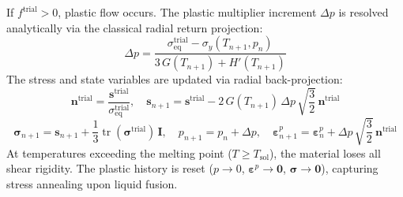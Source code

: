 \documentclass[10pt,a4paper]{article}
\begin{document}
If $f^{\mathrm{trial}} > 0$, plastic flow occurs. The plastic multiplier increment $\Delta p$ is resolved analytically via the classical radial return projection:
\begin{equation}
\Delta p = \frac{\sigma_{\mathrm{eq}}^{\mathrm{trial}} - \sigma_y(T_{n+1}, p_n)}{3\,G(T_{n+1}) + H'(T_{n+1})}
\end{equation}
The stress and state variables are updated via radial back-projection:
\begin{equation}
\mathbf{n}^{\mathrm{trial}} = \frac{\mathbf{s}^{\mathrm{trial}}}{\sigma_{\mathrm{eq}}^{\mathrm{trial}}}, \quad \mathbf{s}_{n+1} = \mathbf{s}^{\mathrm{trial}} - 2\,G(T_{n+1})\,\Delta p\,\sqrt{\frac{3}{2}}\,\mathbf{n}^{\mathrm{trial}}
\end{equation}
\begin{equation}
\boldsymbol{\sigma}_{n+1} = \mathbf{s}_{n+1} + \frac{1}{3}\operatorname{tr}(\boldsymbol{\sigma}^{\mathrm{trial}})\,\mathbf{I}, \quad p_{n+1} = p_n + \Delta p, \quad \boldsymbol{\varepsilon}^p_{n+1} = \boldsymbol{\varepsilon}^p_n + \Delta p\,\sqrt{\frac{3}{2}}\,\mathbf{n}^{\mathrm{trial}}
\end{equation}
At temperatures exceeding the melting point ($T \ge T_{\mathrm{sol}}$), the material loses all shear rigidity. The plastic history is reset ($p \to 0$, $\boldsymbol{\varepsilon}^p \to \mathbf{0}$, $\boldsymbol{\sigma} \to \mathbf{0}$), capturing stress annealing upon liquid fusion.
\end{document}
